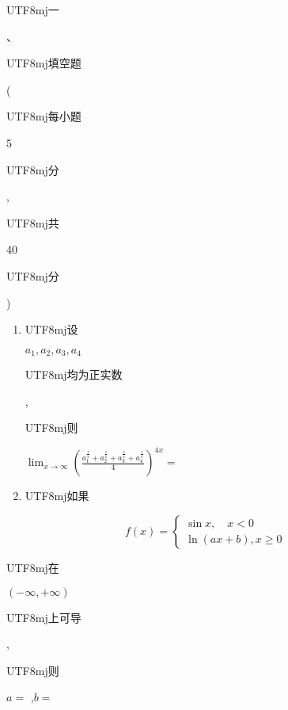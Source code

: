 \documentclass[10pt]{article}
\begin{document}
\begin{CJK}{UTF8}{mj}一\end{CJK}、\begin{CJK}{UTF8}{mj}填空题\end{CJK}(\begin{CJK}{UTF8}{mj}每小题\end{CJK} 5 \begin{CJK}{UTF8}{mj}分\end{CJK}, \begin{CJK}{UTF8}{mj}共\end{CJK} 40 \begin{CJK}{UTF8}{mj}分\end{CJK})

\begin{enumerate}
  \item \begin{CJK}{UTF8}{mj}设\end{CJK} $a_{1}, a_{2}, a_{3}, a_{4}$ \begin{CJK}{UTF8}{mj}均为正实数\end{CJK}, \begin{CJK}{UTF8}{mj}则\end{CJK} $\lim _{x \rightarrow \infty}\left(\frac{a_{1}^{\frac{1}{x}}+a_{2}^{\frac{1}{x}}+a_{3}^{\frac{1}{x}}+a_{4}^{\frac{1}{x}}}{4}\right)^{4 x}=$

  \item \begin{CJK}{UTF8}{mj}如果\end{CJK}

\end{enumerate}
$$
f(x)=\left\{\begin{array}{l}
\sin x, \quad x<0 \\
\ln (a x+b), x \geqslant 0
\end{array}\right.
$$
\begin{CJK}{UTF8}{mj}在\end{CJK} $(-\infty,+\infty)$ \begin{CJK}{UTF8}{mj}上可导\end{CJK}, \begin{CJK}{UTF8}{mj}则\end{CJK} $a=$ ,$b=$
\end{document}
